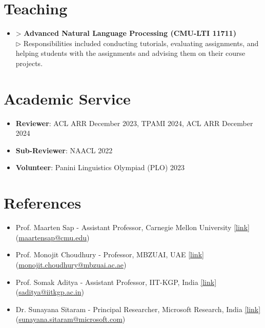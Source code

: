 \documentclass[11pt,letterpaper]{article}
\begin{document}
    \section*{Teaching}
    \begin{itemize}[leftmargin=*,label={},itemsep=4pt]
        \item > \textbf{Advanced Natural Language Processing (CMU-LTI 11711)}\\
            $\triangleright$ 
            Responsibilities included conducting tutorials, evaluating assignments, and helping students with the assignments and advising them on their course projects.
        \\
    \end{itemize}
    
    \section*{Academic Service}
    \begin{itemize}[leftmargin=*,label={},itemsep=4pt]
        \item \textbf{Reviewer}: ACL ARR December 2023, TPAMI 2024, ACL ARR December 2024\
        \item \textbf{Sub-Reviewer}: NAACL 2022\
        \item \textbf{Volunteer}: Panini Linguistics Olympiad (PLO) 2023\
    \end{itemize}
    
    \section*{References}
    \begin{itemize}[leftmargin=*,label={},itemsep=4pt]
        \item 
             Prof. Maarten Sap - Assistant Professor, Carnegie Mellon University  \href{https://maartensap.com}{[link]}
         (\href{mailto:maartensap@cmu.edu}{maartensap@cmu.edu})\
        \item 
             Prof. Monojit Choudhury - Professor, MBZUAI, UAE  \href{https://mbzuai.ac.ae/study/faculty/monojit-choudhury/}{[link]}
         (\href{mailto:monojit.choudhury@mbzuai.ac.ae}{monojit.choudhury@mbzuai.ac.ae})\
        \item 
             Prof. Somak Aditya - Assistant Professor, IIT-KGP, India  \href{https://adityasomak.github.io/}{[link]}
         (\href{mailto:saditya@iitkgp.ac.in}{saditya@iitkgp.ac.in})\
        \item 
             Dr. Sunayana Sitaram - Principal Researcher, Microsoft Research, India  \href{https://www.microsoft.com/en-us/research/people/susitara/}{[link]}
         (\href{mailto:sunayana.sitaram@microsoft.com}{sunayana.sitaram@microsoft.com})\
    \end{itemize}
    
    
\end{document}
